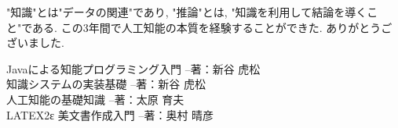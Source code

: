 \documentclass[uplatex,12pt]{jsarticle}
\begin{document}
 "知識"とは"データの関連"であり, "推論"とは, "知識を利用して結論を導くこと"である. この3年間で人工知能の本質を経験することができた. ありがとうございました.

\begin{thebibliography}{99}
 Javaによる知能プログラミング入門 --著：新谷 虎松 \\
 知識システムの実装基礎 --著：新谷 虎松 \\
 人工知能の基礎知識 --著：太原 育夫 \\
 LATEX2ε 美文書作成入門 --著：奥村 晴彦 \\
\end{thebibliography}
\end{document}
